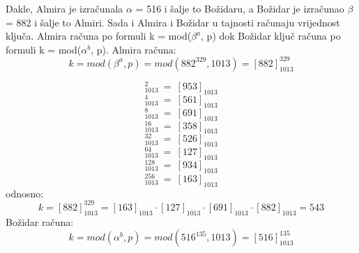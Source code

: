 \documentclass[12pt]{article}
\begin{document}
\begin{enumerate}
Dakle, Almira je izračunala ${\alpha}$ = 516 i šalje to Božidaru, a Božidar je izračunao
${\beta}$ = 882 i šalje to Almiri. Sada i Almira i Božidar u tajnosti računaju vrijednost
ključa. Almira računa po formuli k = mod(${\beta}^a$, p) dok Božidar ključ računa po
formuli k = mod(${\alpha}^b$, p).
\newpage
Almira računa:
\begin{equation*}
    k = mod({\beta}^a, p) = mod(882^{329}, 1013) = [882]_{1013}^{329}
\end{equation*}

\begin{equation*}
    [882]_{1013}^{2}~=~[953]_{1013}
\end{equation*}
\begin{equation*}
    [882]_{1013}^{4}~=~[561]_{1013}
\end{equation*}
\begin{equation*}
    [882]_{1013}^{8}~=~[691]_{1013}
\end{equation*}
\begin{equation*}
    [882]_{1013}^{16}~=~[358]_{1013}
\end{equation*}
\begin{equation*}
    [882]_{1013}^{32}~=~[526]_{1013}
\end{equation*}
\begin{equation*}
    [882]_{1013}^{64}~=~[127]_{1013}
\end{equation*}
\begin{equation*}
    [882]_{1013}^{128}~=~[934]_{1013}
\end{equation*}
\begin{equation*}
    [882]_{1013}^{256}~=~[163]_{1013}
\end{equation*}
odnosno:
\begin{equation*}
    k = [882]_{1013}^{329} = [163]_{1013} \cdot [127]_{1013} \cdot [691]_{1013} \cdot [882]_{1013} = 543
\end{equation*}
Božidar računa:
\begin{equation*}
    k = mod({\alpha}^b, p) = mod(516^{135}, 1013) = [516]_{1013}^{135}
\end{equation*}


\end{enumerate}
\end{document}
